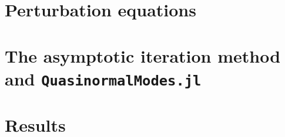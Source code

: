 

\section{Perturbation equations}
\label{ch:qnm_aim:sec:equations}


\section{The asymptotic iteration method and \texttt{QuasinormalModes.jl}}
\label{ch:qnm_aim:sec:aim}


\section{Results}
\label{ch:qnm_aim:sec:results}
